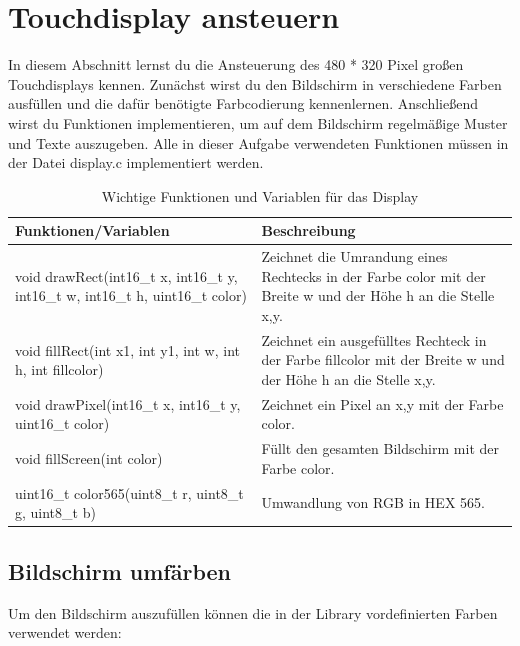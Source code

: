 \section{\ExercisePrefixEmbeddedC Touchdisplay ansteuern \optional}
In diesem Abschnitt lernst du die Ansteuerung des 480 * 320 Pixel großen Touchdisplays kennen. Zunächst wirst du den Bildschirm in verschiedene Farben ausfüllen und die dafür benötigte Farbcodierung kennenlernen. Anschließend wirst du Funktionen implementieren, um auf dem Bildschirm regelmäßige Muster und Texte auszugeben. Alle in dieser Aufgabe verwendeten Funktionen müssen in der Datei display.c implementiert werden. 

\begin{table}[]
	\centering
	\caption{Wichtige Funktionen und Variablen für das Display}
	\label{displayInfo}
	\begin{tabular}{|l|l|}
		\hline
		\textbf{Funktionen/Variablen} & \textbf{Beschreibung} \\ \hline
		void drawRect(int16\_t x, int16\_t y, int16\_t w, int16\_t h, uint16\_t color) & Zeichnet die Umrandung eines Rechtecks in der Farbe color mit der Breite w und der Höhe h an die Stelle x,y. \\ \hline
		void fillRect(int x1, int y1, int w, int h, int fillcolor) & Zeichnet ein ausgefülltes Rechteck in der Farbe fillcolor mit der Breite w und der Höhe h an die Stelle x,y. \\ \hline
		void drawPixel(int16\_t x, int16\_t y, uint16\_t color) & Zeichnet ein Pixel an x,y mit der Farbe color. \\ \hline
		void fillScreen(int color) & Füllt den gesamten Bildschirm mit der Farbe color. \\ \hline
		uint16\_t color565(uint8\_t r, uint8\_t g, uint8\_t b) & Umwandlung von RGB in HEX 565. \\ \hline
	\end{tabular}
\end{table}

\subsection{Bildschirm umfärben}
Um den Bildschirm auszufüllen können die in der Library vordefinierten Farben verwendet werden:

